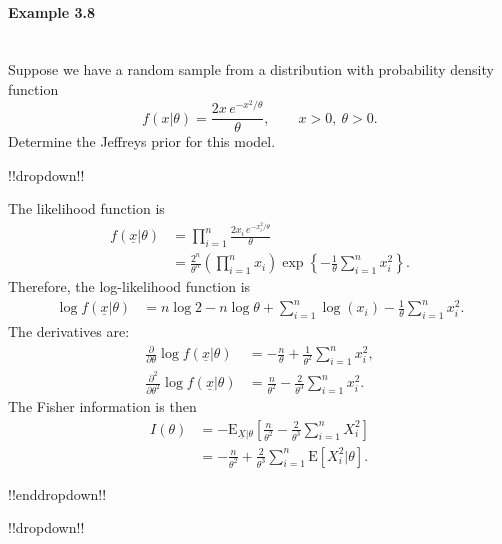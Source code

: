 \paragraph{Example 3.8}{~\\
Suppose we have a random sample from a distribution with probability  density function
\begin{equation*}
f(x|\theta)=\frac{2x\,e^{-x^2/\theta}}{\theta},\quad\quad x>0,~\theta>0.
\end{equation*}
Determine the Jeffreys prior for this model.

!!dropdown!!

The likelihood function is
        \begin{align*}
        f(\underline{x}|\theta) 
        &=\prod_{i=1}^n \frac{2x_i\,e^{-x_i^2/\theta}}{\theta} \\
        &=\frac{2^n}{\theta^n}\left(\prod_{i=1}^n x_i\right)
        \exp\left\{-\frac{1}{\theta}\sum_{i=1}^n x_i^2\right\}.
        \end{align*}
        Therefore, the log-likelihood function is
        \begin{align*}
            \log f(\underline{x} | \theta) &= n\log 2 - n\log \theta + \sum_{i=1}^n\log(x_i) - \frac{1}{\theta}\sum_{i=1}^n x_i^2.
        \end{align*}
        The derivatives are:
        \begin{align*}
            \frac{\partial}{\partial \theta}\log f(\underline{x} | \theta) &= -\frac{n}{\theta} + \frac{1}{\theta^2}\sum_{i=1}^n x_i^2, \\
            \frac{\partial^2}{\partial \theta^2}\log f(\underline{x} | \theta) &= \frac{n}{\theta^2} - \frac{2}{\theta^3}\sum_{i=1}^n x_i^2.
        \end{align*}
        The Fisher information is then
        \begin{align*}
            I(\theta) &= -\text{E}_{\underline{X}|\theta}\left[ \frac{n}{\theta^2} - \frac{2}{\theta^3} \sum_{i=1}^n X_i^2  \right] \\
            &= -\frac{n}{\theta^2} + \frac{2}{\theta^3}\sum_{i=1}^n \text{E}[X_i^2|\theta].
        \end{align*}

!!enddropdown!!

\clearpage

!!dropdown!!

}

